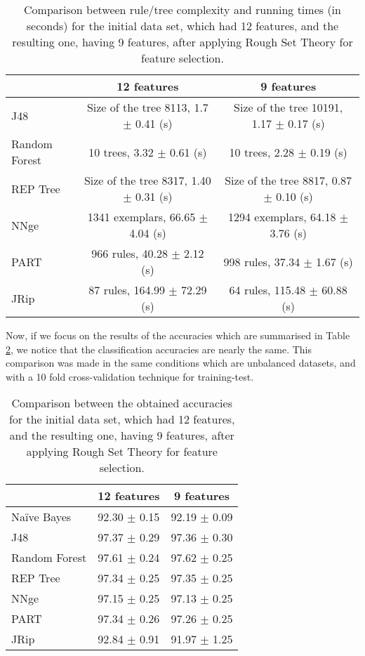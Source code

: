 \documentclass{llncs}
\begin{document}
\begin{table}[htpb]
\centering
 \caption{\label{tab_runningtimes} Comparison between rule/tree complexity and running times (in seconds) for the initial data set, which had 12 features, and the resulting one, having 9 features, after applying Rough Set Theory for feature selection.}
{\small
\begin{tabular}{|l|c|c|}
\cline{2-3}
\multicolumn{1}{l|}{} & 12 features & 9 features \\
\hline
J48 & Size of the tree 8113, 1.7 $\pm$ 0.41 (s) & Size of the tree 10191, 1.17 $\pm$ 0.17 (s) \\
\cline{1-1}
Random Forest & 10 trees, 3.32 $\pm$ 0.61 (s) & 10 trees, 2.28 $\pm$ 0.19 (s) \\
\cline{1-1}
REP Tree & Size of the tree 8317, 1.40 $\pm$ 0.31 (s) & Size of the tree 8817, 0.87 $\pm$ 0.10 (s) \\
\cline{1-1}
NNge & 1341 exemplars, 66.65 $\pm$ 4.04 (s) & 1294 exemplars, 64.18 $\pm$ 3.76 (s) \\
\cline{1-1}
PART & 966 rules, 40.28 $\pm$ 2.12 (s) & 998 rules, 37.34 $\pm$ 1.67 (s) \\
\cline{1-1}
JRip & 87 rules, 164.99 $\pm$ 72.29 (s) & 64 rules, 115.48 $\pm$ 60.88 (s) \\
\hline
\end{tabular}
}
\end{table}

Now, if we focus on the results of the accuracies which are summarised in Table \ref{tab_12featvs9feat}, we notice that the classification accuracies are nearly the same. This comparison was made in the same conditions which are unbalanced datasets, and with a 10 fold cross-validation technique for training-test.

\begin{table}[htpb]
\centering
 \caption{\label{tab_12featvs9feat} Comparison between the obtained accuracies for the initial data set, which had 12 features, and the resulting one, having 9 features, after applying Rough Set Theory for feature selection.}
{\small
\begin{tabular}{|l|c|c|}
\cline{2-3}
\multicolumn{1}{l|}{} & 12 features & 9 features \\
\hline
Na\"ive Bayes & 92.30 $\pm$ 0.15 & 92.19 $\pm$ 0.09\\
\cline{1-1}
J48 & 97.37 $\pm$ 0.29 & 97.36 $\pm$ 0.30 \\
\cline{1-1}
Random Forest & 97.61 $\pm$ 0.24 & 97.62 $\pm$ 0.25 \\
\cline{1-1}
REP Tree & 97.34 $\pm$ 0.25 & 97.35 $\pm$ 0.25 \\
\cline{1-1}
NNge & 97.15 $\pm$ 0.25 & 97.13 $\pm$ 0.25 \\
\cline{1-1}
PART & 97.34 $\pm$ 0.26 & 97.26 $\pm$ 0.25 \\
\cline{1-1}
JRip & 92.84 $\pm$ 0.91 & 91.97 $\pm$ 1.25 \\
\hline
\end{tabular}
}
\end{table}
\end{document}
